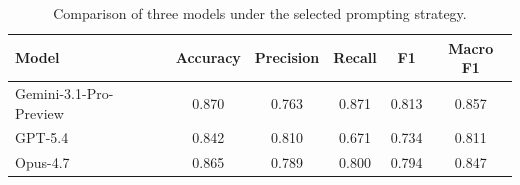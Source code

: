 \begin{table}[t]
\centering
\caption{Comparison of three models under the selected prompting strategy.}
\label{tab:four_models_strongest_prompt}
\begin{tabular}{lccccc}
\hline
Model & Accuracy & Precision & Recall & F1& Macro F1 \\
\hline
Gemini-3.1-Pro-Preview & 0.870 & 0.763 & 0.871 & 0.813 & 0.857 \\
GPT-5.4 & 0.842 & 0.810 & 0.671 & 0.734 & 0.811 \\
Opus-4.7 & 0.865 & 0.789 & 0.800 & 0.794 & 0.847 \\
\hline
\end{tabular}
\end{table}
